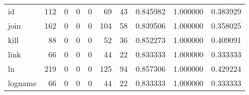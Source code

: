 \begin{tabular}{lrrrrrrrrr}
id        &                                   112 &                                                  0 &                                                  0 &                                                  0 &                                                 69 &                                                 43 &                                           0.845982 &                               1.000000 &                             0.383929 \\
join      &                                   162 &                                                  0 &                                                  0 &                                                  0 &                                                104 &                                                 58 &                                           0.839506 &                               1.000000 &                             0.358025 \\
kill      &                                    88 &                                                  0 &                                                  0 &                                                  0 &                                                 52 &                                                 36 &                                           0.852273 &                               1.000000 &                             0.409091 \\
link      &                                    66 &                                                  0 &                                                  0 &                                                  0 &                                                 44 &                                                 22 &                                           0.833333 &                               1.000000 &                             0.333333 \\
ln        &                                   219 &                                                  0 &                                                  0 &                                                  0 &                                                125 &                                                 94 &                                           0.857306 &                               1.000000 &                             0.429224 \\
logname   &                                    66 &                                                  0 &                                                  0 &                                                  0 &                                                 44 &                                                 22 &                                           0.833333 &                               1.000000 &                             0.333333 \\

\end{tabular}
